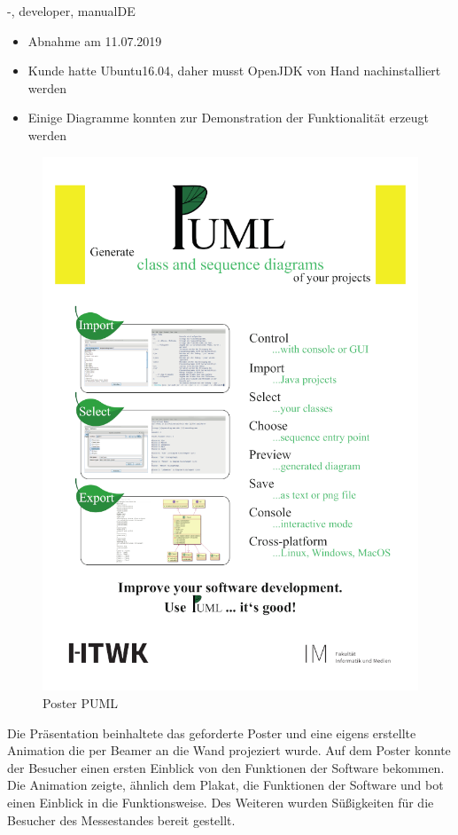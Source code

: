 \documentclass[twoside]{report}
\begin{document}
\begin{shownto}{-, developer, manualDE}

\begin{itemize}
\item Abnahme am 11.07.2019
\item Kunde hatte Ubuntu16.04, daher musst OpenJDK von Hand nachinstalliert werden
\item Einige Diagramme konnten zur Demonstration der Funktionalität erzeugt werden
\end{itemize}
\nsecend

\begin{figure}
	\centering
	\includegraphics{Bilder/Puml_Plakat.png}
	\caption{Poster PUML}
	\label{img:Poster}
\end{figure}

Die Präsentation beinhaltete das geforderte Poster und eine eigens erstellte Animation die per Beamer an die Wand projeziert wurde. Auf dem Poster konnte der Besucher einen ersten Einblick von den Funktionen der Software bekommen. Die Animation zeigte, ähnlich dem Plakat, die Funktionen der Software und bot einen Einblick in die Funktionsweise.
Des Weiteren wurden Süßigkeiten für die Besucher des Messestandes bereit gestellt.
\nsecend


\end{shownto}
\end{document}
